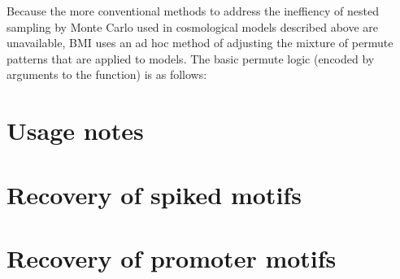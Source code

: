 Because the more conventional methods to address the ineffiency of nested sampling by Monte Carlo used in cosmological models described above are unavailable, BMI uses an ad hoc method of adjusting the mixture of permute patterns that are applied to models. The basic permute logic (encoded by  arguments to the  function) is as follows:


\section{Usage notes}

\section{Recovery of spiked motifs}

\section{Recovery of promoter motifs}